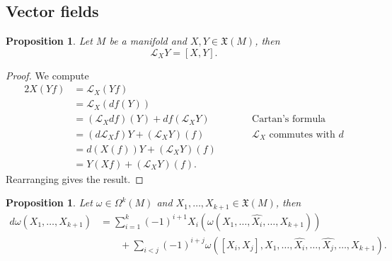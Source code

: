\documentclass[reqno]{amsart}
\newtheorem{proposition}[theorem]{Proposition}
\theoremstyle{definition}
\theoremstyle{remark}
\begin{document}
\subsection{Vector fields}

\begin{proposition}
	Let $M$ be a manifold and $X, Y \in \mathfrak X (M)$, then 
		\[ \mathcal L_X Y = [X, Y]. \]
\end{proposition}

\begin{proof}
	We compute 
		\begin{alignat*}{2}
			X(Yf)
				&= \mathcal L_X (Yf) \\
				&= \mathcal L_X (df(Y)) \\
				&= (\mathcal L_X df)(Y) + df (\mathcal L_X Y) 
				&&\qquad \text{Cartan's formula} \\
				&= (d \mathcal L_X f) Y + (\mathcal L_X Y) (f) 
				&&\qquad \text{$\mathcal L_X$ commutes with $d$}\\
				&= d(X(f)) Y + (\mathcal L_X Y) (f) \\
				&= Y(Xf) + (\mathcal L_X Y) (f).
		\end{alignat*}
	Rearranging gives the result. 	
\end{proof}

\begin{proposition}
	Let $\omega \in \Omega^k (M)$ and $X_1, \dots, X_{k + 1} \in \mathfrak X (M)$, then 
		\begin{align*}
			d \omega(X_1, \dots, X_{k + 1})
				&= \sum_{i = 1}^k (-1)^{i + 1} X_i (\omega(X_1, \dots, \widehat{X_i}, \dots, X_{k + 1}))\\
				&\qquad + \sum_{i < j} (-1)^{i + j} \omega([X_i, X_j],X_1, \dots, \widehat{X_i}, \dots, \widehat{X_j}, \dots, X_{k + 1}).
		\end{align*}
\end{proposition}
\end{document}

